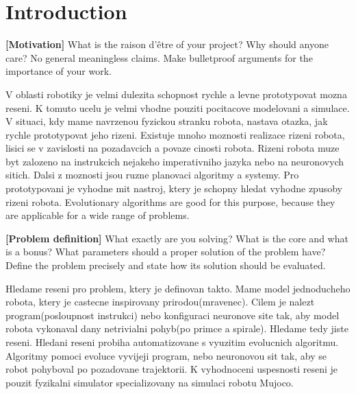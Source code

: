 \documentclass{ExcelAtFIT}
\affiliation{*%
  \href{mailto:herout@fit.vutbr.cz}{herout@fit.vutbr.cz},
  \textit{Faculty of Information Technology, Brno University of Technology}}
\begin{document}
\startdocument



\section{Introduction}

\textbf{[Motivation]} What is the raison d'\^{e}tre of your project? Why should anyone care? No general meaningless claims. Make bulletproof arguments for the importance of your work.

V oblasti robotiky je velmi dulezita schopnost rychle a levne prototypovat mozna reseni.
K tomuto ucelu je velmi vhodne pouziti pocitacove modelovani a simulace.
V situaci, kdy mame navrzenou fyzickou stranku robota, nastava otazka, jak rychle prototypovat jeho rizeni.
Existuje mnoho moznosti realizace rizeni robota, lisici se v zavislosti na pozadavcich a povaze cinosti robota.
Rizeni robota muze byt zalozeno na instrukcich nejakeho imperativniho jazyka nebo na neuronovych sitich.
Dalsi z moznosti jsou ruzne planovaci algoritmy a systemy. 
Pro prototypovani je vyhodne mit nastroj, ktery je schopny hledat vyhodne zpusoby rizeni robota.
Evolutionary algorithms are good for this purpose, because they are applicable for a wide range of problems.

\textbf{[Problem definition]} What exactly are you solving? What is the core and what is a bonus? What parameters should a proper solution of the problem have? Define the problem precisely and state how its solution should be evaluated.

Hledame reseni pro problem, ktery je definovan takto.
Mame model jednoducheho robota, ktery je castecne inspirovany prirodou(mravenec). 
Cilem je nalezt program(posloupnost instrukci) nebo konfiguraci neuronove site tak, aby model robota vykonaval dany netrivialni pohyb(po primce a spirale).
Hledame tedy jiste reseni.
Hledani reseni probiha automatizovane s vyuzitim evolucnich algoritmu.
Algoritmy pomoci evoluce vyvijeji program, nebo neuronovou sit tak, aby se robot pohyboval po pozadovane trajektorii.
K vyhodnoceni uspesnosti reseni je pouzit fyzikalni simulator specializovany na simulaci robotu Mujoco\cite{Todorov2012}.
\end{document}
